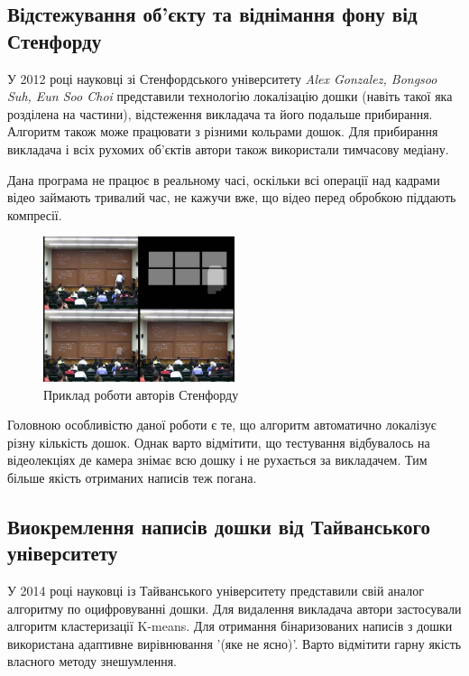 \subsection{Відстежування об'єкту та віднімання фону від Стенфорду}

У 2012 році науковці зі Стенфордського університету \textit{Alex Gonzalez, 
Bongsoo Suh, Eun Soo Choi} представили технологію \cite{sah} локалізацію дошки
(навіть такої яка розділена на частини), відстеження викладача та його
подальше прибирання. Алгоритм також може працювати з різними кольрами
дошок. Для прибирання викладача і всіх рухомих об'єктів автори також 
використали тимчасову медіану.

Дана програма не працює в реальному часі, оскільки всі операції над кадрами
відео займають тривалий час, не кажучи вже, що відео перед обробкою 
піддають компресії.

\begin{figure}[h]
  \centering
  \includegraphics[width=0.5\textwidth]{images/sah}
  \caption{Приклад роботи авторів Стенфорду}
  \label{fig:sah}
\end{figure}

Головною особливістю даної роботи є те, що  алгоритм автоматично локалізує 
різну кількість дошок. Однак варто відмітити, що тестування відбувалось на
відеолекціях де камера знімає всю дошку і не рухається за викладачем. Тим більше
якість отриманих написів теж погана.

\subsection{Виокремлення написів дошки від Тайванського університету}

У 2014 році науковці із Тайванського університету представили свій аналог \cite{yeh} 
алгоритму по оцифровуванні дошки. Для видалення викладача автори застосували 
алгоритм кластеризації K-means. Для отримання бінаризованих написів з дошки 
використана адаптивне вирівнювання '(яке не ясно)'. Варто відмітити гарну
якість власного методу знешумлення.

